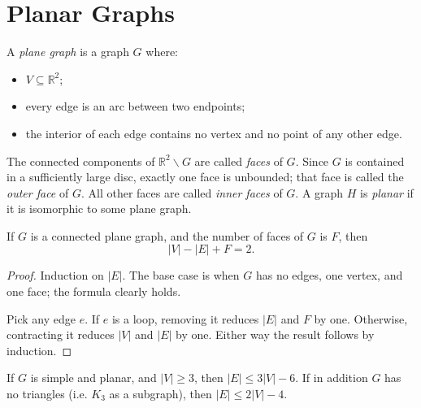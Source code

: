     \section{Planar Graphs}
        \begin{defn} \label{def_planar_graph}
            A \emph{plane graph} is a graph $G$ where: \begin{itemize}
                \item $V \subseteq \mathbb{R}^2$;
                \item every edge is an arc between two endpoints;
                \item the interior of each edge contains no vertex and no point of any other edge.
            \end{itemize}
            The connected components of $\mathbb{R}^2 \backslash G$ are called \emph{faces} of $G$. Since $G$ is contained in a sufficiently large disc, exactly one face is unbounded; that face is called the \emph{outer face} of $G$. All other faces are called \emph{inner faces} of $G$. A graph $H$ is \emph{planar} if it is isomorphic to some plane graph.
        \end{defn}
        
        \begin{thm} \label{thm_euler_vef}
            If $G$ is a connected plane graph, and the number of faces of $G$ is $F$, then \begin{displaymath}
                |V| - |E| + F = 2.
            \end{displaymath}
        \end{thm}
        
        \begin{proof}
            Induction on $|E|$. The base case is when $G$ has no edges, one vertex, and one face; the formula clearly holds.
            
            Pick any edge $e$. If $e$ is a loop, removing it reduces $|E|$ and $F$ by one. Otherwise, contracting it reduces $|V|$ and $|E|$ by one. Either way the result follows by induction.
        \end{proof}
        
        \begin{thm} \label{thm_planar_ve}
            If $G$ is simple and planar, and $|V| \geq 3$, then $|E| \leq 3|V|-6$. If in addition $G$ has no triangles (i.e. $K_3$ as a subgraph), then $|E| \leq 2|V|-4$.
        \end{thm}
        
